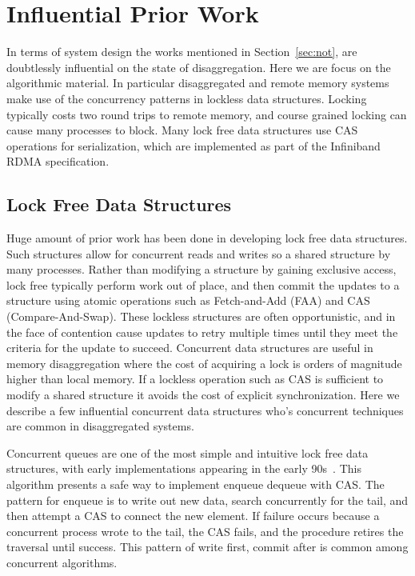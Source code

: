   
\section{Influential Prior Work}

In terms of system design the works mentioned in Section~\ref{sec:not}, are
doubtlessly influential on the state of disaggregation. Here we are focus on the
algorithmic material. In particular disaggregated and remote memory systems make
use of the concurrency patterns in lockless data structures. Locking typically
costs two round trips to remote memory, and course grained locking can cause
many processes to block. Many lock free data structures use CAS operations for
serialization, which are implemented as part of the Infiniband RDMA
specification.

\subsection{Lock Free Data Structures}

Huge amount of prior work has been done in developing lock free data structures.
Such structures allow for concurrent reads and writes so a shared structure by
many processes. Rather than modifying a structure by gaining exclusive access,
lock free typically perform work out of place, and then commit the updates to a
structure using atomic operations such as Fetch-and-Add (FAA) and CAS
(Compare-And-Swap). These lockless structures are often opportunistic, and in
the face of contention cause updates to retry multiple times until they meet the
criteria for the update to succeed. Concurrent data structures are useful in
memory disaggregation where the cost of acquiring a lock is orders of magnitude
higher than local memory. If a lockless operation such as CAS is sufficient to
modify a shared structure it avoids the cost of explicit synchronization. Here
we describe a few influential concurrent data structures who's concurrent
techniques are common in disaggregated systems.

Concurrent queues are one of the most simple and intuitive lock free data
structures, with early implementations appearing in the early
90s~\cite{simple-fast}. This algorithm presents a safe way to implement enqueue
dequeue with CAS. The pattern for enqueue is to write out new data, search
concurrently for the tail, and then attempt a CAS to connect the new element. If
failure occurs because a concurrent process wrote to the tail, the CAS fails,
and the procedure retires the traversal until success. This pattern of write
first, commit after is common among concurrent algorithms.


